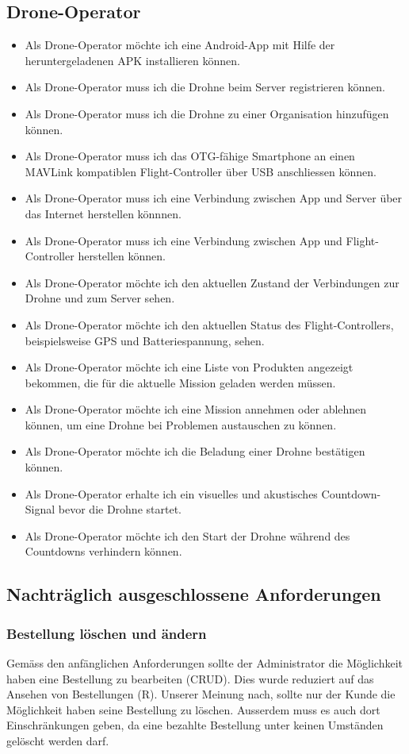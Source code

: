 \subsection{Drone-Operator}
\begin{itemize}
	\item Als Drone-Operator möchte ich eine Android-App mit Hilfe der heruntergeladenen \Gls{APK} installieren können.
	\item Als Drone-Operator muss ich die Drohne beim Server registrieren können.
	\item Als Drone-Operator muss ich die Drohne zu einer Organisation hinzufügen können.
	\item Als Drone-Operator muss ich das \Gls{OTG}-fähige Smartphone an einen \Gls{MAVLink} kompatiblen \Gls{Flight-Controller} über USB anschliessen können.
	\item Als Drone-Operator muss ich eine Verbindung zwischen App und Server über das Internet herstellen könnnen.
	\item Als Drone-Operator muss ich eine Verbindung zwischen App und \Gls{Flight-Controller} herstellen können.
	\item Als Drone-Operator möchte ich den aktuellen Zustand der Verbindungen zur Drohne und zum Server sehen.
	\item Als Drone-Operator möchte ich den aktuellen Status des \Gls{Flight-Controller}s, beispielsweise GPS und Batteriespannung, sehen.
	\item Als Drone-Operator möchte ich eine Liste von Produkten angezeigt bekommen, die für die aktuelle Mission geladen werden müssen.
	\item Als Drone-Operator möchte ich eine Mission annehmen oder ablehnen können, um eine Drohne bei Problemen austauschen zu können.
	\item Als Drone-Operator möchte ich die Beladung einer Drohne bestätigen können.
	\item Als Drone-Operator erhalte ich ein visuelles und akustisches Countdown-Signal bevor die Drohne startet.
	\item Als Drone-Operator möchte ich den Start der Drohne während des Countdowns verhindern können.
\end{itemize}

\subsection{Nachträglich ausgeschlossene Anforderungen}

\subsubsection{Bestellung löschen und ändern}
Gemäss den anfänglichen Anforderungen sollte der Administrator die Möglichkeit haben eine Bestellung zu bearbeiten (\Gls{CRUD}). Dies wurde reduziert auf das Ansehen von Bestellungen (R). Unserer Meinung nach, sollte nur der Kunde die Möglichkeit haben seine Bestellung zu löschen. Ausserdem muss es auch dort Einschränkungen geben, da eine bezahlte Bestellung unter keinen Umständen gelöscht werden darf.


